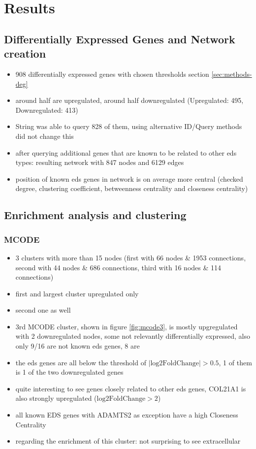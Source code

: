 \section{Results}
\subsection{Differentially Expressed Genes and Network creation}
\begin{itemize}
	\item 908 differentially expressed genes with chosen thresholds section \ref{sec:methods-deg}
	\item around half are upregulated, around half downregulated (Upregulated: 495, Downregulated: 413)
	\item String was able to query 828 of them, using alternative ID/Query methods did not change this
	\item after querying additional genes that are known to be related to other eds types: resulting network with 847 nodes and 6129 edges
	\item position of known eds genes in network is on average more central (checked degree, clustering coefficient, betweenness centrality and closeness centrality)
\end{itemize}

\subsection{Enrichment analysis and clustering}

\subsubsection{MCODE}

\begin{itemize}
	\item 3 clusters with more than 15 nodes (first with 66 nodes \& 1953 connections, second with 44 nodes \& 686 connections, third with 16 nodes \& 114 connections)
	\item first and largest cluster upregulated only
	\item second one as well
	\item 3rd MCODE cluster, shown in figure \ref{fig:mcode3}, is mostly upgregulated with 2 downregulated nodes, some not relevantly differentially expressed, also only 9/16 are not known eds genes, 8 are
	\item the eds genes are all below the threshold of $|\text{log2FoldChange}| > 0.5$, 1 of them is 1 of the two downregulated genes
	\item quite interesting to see genes closely related to other eds genes, COL21A1 is also strongly upregulated ($\text{log2FoldChange} > 2$)
	\item all known EDS genes with ADAMTS2 as exception have a high Closeness Centrality
	\item regarding the enrichment of this cluster: not surprising to see extracellular
\end{itemize}

